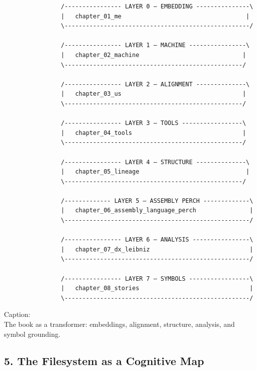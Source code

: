 \begin{verbatim}
                /---------------- LAYER 0 — EMBEDDING ---------------\
                |   chapter_01_me                                   |
                \----------------------------------------------------/

                /---------------- LAYER 1 — MACHINE ----------------\
                |   chapter_02_machine                             |
                \--------------------------------------------------/

                /---------------- LAYER 2 — ALIGNMENT --------------\
                |   chapter_03_us                                  |
                \--------------------------------------------------/

                /---------------- LAYER 3 — TOOLS -----------------\
                |   chapter_04_tools                               |
                \--------------------------------------------------/

                /---------------- LAYER 4 — STRUCTURE --------------\
                |   chapter_05_lineage                              |
                \--------------------------------------------------/

                /------------- LAYER 5 — ASSEMBLY PERCH -------------\
                |   chapter_06_assembly_language_perch               |
                \----------------------------------------------------/

                /---------------- LAYER 6 — ANALYSIS ----------------\
                |   chapter_07_dx_leibniz                            |
                \----------------------------------------------------/

                /---------------- LAYER 7 — SYMBOLS -----------------\
                |   chapter_08_stories                               |
                \----------------------------------------------------/
\end{verbatim}

Caption:\\
The book as a transformer: embeddings, alignment, structure, analysis,
and symbol grounding.

\hypertarget{the-filesystem-as-a-cognitive-map}{%
\subsection{5. The Filesystem as a Cognitive
Map}\label{the-filesystem-as-a-cognitive-map}}

